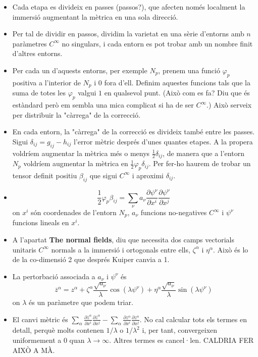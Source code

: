 {\begin{itemize}
    \item Cada etapa es divideix en passes (passos?), que afecten només localment la immersió augmentant la mètrica en una sola direcció. 
    \item Per tal de dividir en passos, dividim la varietat en una sèrie d'entorns amb $n$ paràmetres $C^\infty$ no singulars, i cada entorn es pot trobar amb un nombre finit d'altres entorns.
    \item Per cada un d'aquests entorns, per exemple $N_p$, prenem una funció $\varphi_p$ positiva a l'interior de $N_p$ i $0$ fora d'ell. Definim aquestes funcions tals que la suma de totes les $\varphi_p$ valgui $1$ en qualsevol punt. (Això com es fa? Diu que és estàndard però em sembla una mica complicat si ha de ser $C^\infty$.) Això serveix per distribuir la "càrrega" de la correcció.
    \item En cada entorn, la "càrrega" de la correcció es divideix també entre les passes. Sigui $\delta_{ij}=g_{ij}-h_{ij}$ l'error mètric després d'unes quantes etapes. A la propera voldríem augmentar la mètrica més o menys $\frac12\delta_{ij}$, de manera que a l'entorn $N_p$ voldríem augmentar la mètrica en $\frac12\varphi_p\delta_{ij}$. Per fer-ho haurem de trobar un tensor definit positiu $\beta_{ij}$ que sigui $C^\infty$ i aproximi $\delta_{ij}$.
    \item $$\frac12\varphi_p\beta_{ij} = \sum_{\nu}a_{\nu}\frac{\partial\psi^\nu}{\partial x^i}\frac{\partial\psi^\nu}{\partial x^j}$$ on $x^i$ són coordenades de l'entorn $N_p$, $a_\nu$ funcions no-negatives $C^\infty$ i $\psi^\nu$ funcions lineals en $x^i$.
    \item A l'apartat \textbf{The normal fields}, diu que necessita dos camps vectorials unitaris $C^\infty$ normals a la immersió i ortogonals entre ells, $\zeta^\alpha$ i $\eta^\alpha$. Això és lo de la co-dimensió 2 que després Kuiper canvia a 1.
    \item La pertorbació associada a $a_\nu$ i $\psi^\nu$ és 
        \begin{equation}
            \boxed{\overline{z}^\alpha = z^\alpha + \zeta^\alpha\frac{\sqrt{a_\nu}}{\lambda}\cos(\lambda \psi^\nu) + \eta^\alpha\frac{\sqrt{a_\nu}}{\lambda}\sin(\lambda \psi^\nu)}
        \end{equation}
        on $\lambda$ és un paràmetre que podem triar.
    \item El canvi mètric és $\sum_\alpha\frac{\partial\overline{z}^\alpha}{\partial x^i}\frac{\partial\overline{z}^\alpha}{\partial x^j}-\sum_\alpha\frac{\partial z^\alpha}{\partial x^i}\frac{\partial z^\alpha}{\partial x^j}$. No cal calcular tots els termes en detall, perquè molts contenen $1/\lambda$ o $1/\lambda^2$ i, per tant, convergeixen uniformement a $0$ quan $\lambda\to\infty$. Altres termes es cancel·len. CALDRIA FER AIXÒ A MÀ.

\end{itemize}}
